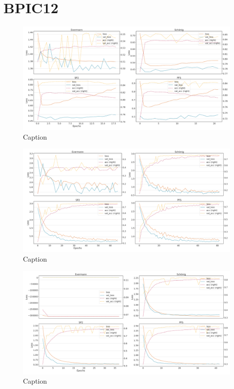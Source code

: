 \section{BPIC12}
\begin{figure}[!htb]
    \centering
    \includegraphics[width=\textwidth]{gfx/bpic2012/individual_loss_acc_curve.png}
    \caption{Caption}
    \label{fig:my_label}
\end{figure}
\begin{figure}[!htb]
    \centering
    \includegraphics[width=\textwidth]{gfx/bpic2012/grouped_loss_acc_curve.png}
    \caption{Caption}
    \label{fig:my_label}
\end{figure}
\begin{figure}[!htb]
    \centering
    \includegraphics[width=\textwidth]{gfx/bpic2012/padded_loss_acc_curve.png}
    \caption{Caption}
    \label{fig:my_label}
\end{figure}
